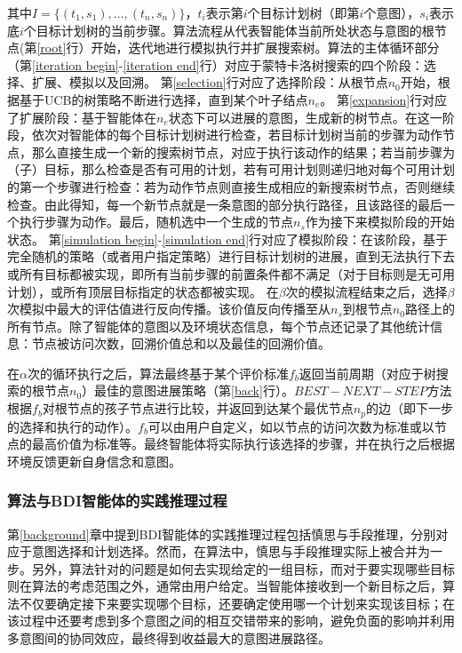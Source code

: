 其中$I=\{(t_1,s_1), \dots, (t_n, s_n)\}$，$t_i$表示第$i$个目标计划树（即第$i$个意图），$s_i$表示底$i$个目标计划树的当前步骤。算法流程从代表智能体当前所处状态与意图的根节点(第\ref{root}行）开始，迭代地进行模拟执行并扩展搜索树。算法的主体循环部分（第\ref{iteration begin}-\ref{iteration end}行）对应于蒙特卡洛树搜索的四个阶段：选择、扩展、模拟以及回溯。
第\ref{selection}行对应了选择阶段：从根节点$n_0$开始，根据基于UCB的树策略不断进行选择，直到某个叶子结点$n_e$。
第\ref{expansion}行对应了扩展阶段：基于智能体在$n_e$状态下可以进展的意图，生成新的树节点。在这一阶段，依次对智能体的每个目标计划树进行检查，若目标计划树当前的步骤为动作节点，那么直接生成一个新的搜索树节点，对应于执行该动作的结果；若当前步骤为（子）目标，那么检查是否有可用的计划，若有可用计划则递归地对每个可用计划的第一个步骤进行检查：若为动作节点则直接生成相应的新搜索树节点，否则继续检查。由此得知，每一个新节点就是一条意图的部分执行路径，且该路径的最后一个执行步骤为动作。最后，随机选中一个生成的节点$n_s$作为接下来模拟阶段的开始状态。
第\ref{simulation begin}-\ref{simulation end}行对应了模拟阶段：在该阶段，基于完全随机的策略（或者用户指定策略）进行目标计划树的进展，直到无法执行下去或所有目标都被实现，即所有当前步骤的前置条件都不满足（对于目标则是无可用计划），或所有顶层目标指定的状态都被实现。
在$\beta$次的模拟流程结束之后，选择$\beta$次模拟中最大的评估值进行反向传播。该价值反向传播至从$n_s$到根节点$n_0$路径上的所有节点。除了智能体的意图以及环境状态信息，每个节点还记录了其他统计信息：节点被访问次数，回溯价值总和以及最佳的回溯价值。

在$\alpha$次的循环执行之后，\SA 算法最终基于某个评价标准$f_b$返回当前周期（对应于树搜索的根节点$n_0$）最佳的意图进展策略（第\ref{back}行）。$BEST-NEXT-STEP$方法根据$f_b$对根节点的孩子节点进行比较，并返回到达某个最优节点$n_p$的边（即下一步的选择和执行的动作）。$f_b$可以由用户自定义，如以节点的访问次数为标准或以节点的最高价值为标准等。最终智能体将实际执行该选择的步骤，并在执行之后根据环境反馈更新自身信念和意图。

\subsubsection{\SA 算法与BDI智能体的实践推理过程}
第\ref{background}章中提到BDI智能体的实践推理过程包括慎思与手段推理，分别对应于意图选择和计划选择。然而，在\SA 算法中，慎思与手段推理实际上被合并为一步。另外，\SA 算法针对的问题是如何去实现给定的一组目标，而对于要实现哪些目标则在\SA 算法的考虑范围之外，通常由用户给定。当智能体接收到一个新目标之后，\SA 算法不仅要确定接下来要实现哪个目标，还要确定使用哪一个计划来实现该目标；在该过程中还要考虑到多个意图之间的相互交错带来的影响，避免负面的影响并利用多意图间的协同效应，最终得到收益最大的意图进展路径。

